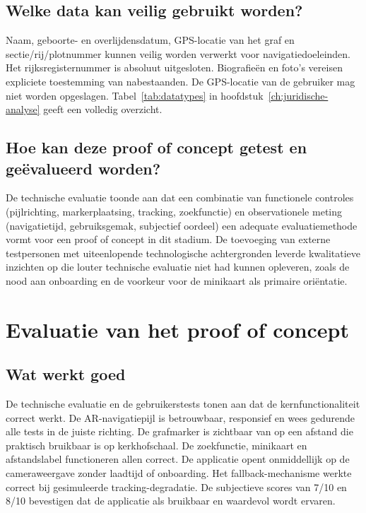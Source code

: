 \subsection{Welke data kan veilig gebruikt worden?}

Naam, geboorte- en overlijdensdatum, GPS-locatie van het graf en
sectie/rij/plotnummer kunnen veilig worden verwerkt voor navigatiedoeleinden.
Het rijksregisternummer is absoluut uitgesloten. Biografieën en foto's vereisen
expliciete toestemming van nabestaanden. De GPS-locatie van de gebruiker mag
niet worden opgeslagen. Tabel~\ref{tab:datatypes} in
hoofdstuk~\ref{ch:juridische-analyse} geeft een volledig overzicht.

\subsection{Hoe kan deze proof of concept getest en geëvalueerd worden?}

De technische evaluatie toonde aan dat een combinatie van functionele controles
(pijlrichting, markerplaatsing, tracking, zoekfunctie) en observationele meting
(navigatietijd, gebruiksgemak, subjectief oordeel) een adequate evaluatiemethode
vormt voor een proof of concept in dit stadium. De toevoeging van externe
testpersonen met uiteenlopende technologische achtergronden leverde kwalitatieve
inzichten op die louter technische evaluatie niet had kunnen opleveren, zoals de
nood aan onboarding en de voorkeur voor de minikaart als primaire oriëntatie.

\section{Evaluatie van het proof of concept}

\subsection{Wat werkt goed}

De technische evaluatie en de gebruikerstests tonen aan dat de kernfunctionaliteit
correct werkt. De AR-navigatiepijl is betrouwbaar, responsief en wees gedurende
alle tests in de juiste richting. De grafmarker is zichtbaar van op een afstand
die praktisch bruikbaar is op kerkhofschaal. De zoekfunctie, minikaart en
afstandslabel functioneren allen correct. De applicatie opent onmiddellijk op
de cameraweergave zonder laadtijd of onboarding. Het fallback-mechanisme werkte
correct bij gesimuleerde tracking-degradatie. De subjectieve scores van 7/10 en
8/10 bevestigen dat de applicatie als bruikbaar en waardevol wordt ervaren.

